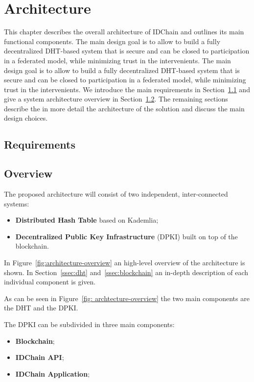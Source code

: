 \chapter{Architecture}
\label{chapter:architecture}

This chapter describes the overall architecture of IDChain and outlines its main functional components.
The main design goal is to allow to build a fully decentralized DHT-based system that is secure and can be closed to participation in a federated model, while minimizing trust in the intervenients.
The main design goal is to allow to build a fully decentralized DHT-based system that is secure and can be closed to participation in a federated model, while minimizing trust in the intervenients.
We introduce the main requirements in Section~\ref{architecture:requirements} and give a system architecture overview in Section~\ref{architecture:overview}.
The remaining sections describe the in more detail the architecture of the solution and discuss the main design choices.

\section{Requirements}\label{architecture:requirements}

\section{Overview}\label{architecture:overview}
The proposed architecture will consist of two independent, inter-connected systems:

\begin{itemize}
	\item \textbf{Distributed Hash Table} based on Kademlia;
	\item \textbf{Decentralized Public Key Infrastructure} (DPKI) built on top of the blockchain.
\end{itemize}


In Figure~\ref{fig:architecture-overview} an high-level overview of the architecture is shown.
In Section~\ref{ssec:dht} and~\ref{ssec:blockchain} an in-depth description of each individual component is given.

As can be seen in Figure~\ref{fig: archtecture-overview} the two main components are the \ac{DHT} and the \ac{DPKI}.

The DPKI can be subdivided in three main components:
\begin{itemize}
	\item \textbf{Blockchain};
	\item \textbf{IDChain API};
	\item \textbf{IDChain Application};
\end{itemize}

